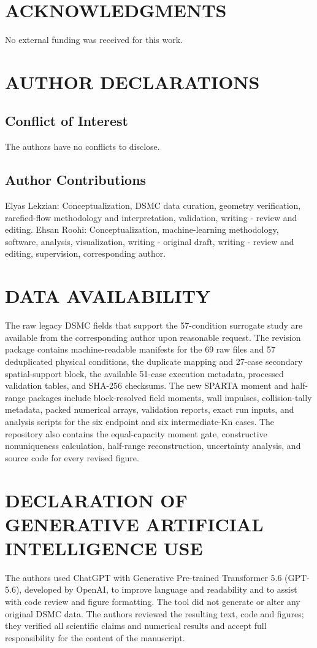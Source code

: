 \documentclass[aip,pof,preprint,notitlepage,floatfix,amsmath,amssymb]{revtex4-2}
\newcommand{\Kn}{\mathrm{Kn}}
\begin{document}
\section*{ACKNOWLEDGMENTS}
No external funding was received for this work.

\section*{AUTHOR DECLARATIONS}
\subsection*{Conflict of Interest}
The authors have no conflicts to disclose.

\subsection*{Author Contributions}
Elyas Lekzian: Conceptualization, DSMC data curation, geometry verification, rarefied-flow methodology and interpretation, validation, writing - review and editing. Ehsan Roohi: Conceptualization, machine-learning methodology, software, analysis, visualization, writing - original draft, writing - review and editing, supervision, corresponding author.

\section*{DATA AVAILABILITY}
The raw legacy DSMC fields that support the 57-condition surrogate study are available from the corresponding author upon reasonable request. The revision package contains machine-readable manifests for the 69 raw files and 57 deduplicated physical conditions, the duplicate mapping and 27-case secondary spatial-support block, the available 51-case execution metadata, processed validation tables, and SHA-256 checksums. The new SPARTA moment and half-range packages include block-resolved field moments, wall impulses, collision-tally metadata, packed numerical arrays, validation reports, exact run inputs, and analysis scripts for the six endpoint and six intermediate-$\Kn$ cases. The repository also contains the equal-capacity moment gate, constructive nonuniqueness calculation, half-range reconstruction, uncertainty analysis, and source code for every revised figure.

\section*{DECLARATION OF GENERATIVE ARTIFICIAL INTELLIGENCE USE}
The authors used ChatGPT with Generative Pre-trained Transformer 5.6 (GPT-5.6), developed by OpenAI, to improve language and readability and to assist with code review and figure formatting. The tool did not generate or alter any original DSMC data. The authors reviewed the resulting text, code and figures; they verified all scientific claims and numerical results and accept full responsibility for the content of the manuscript.
\end{document}
